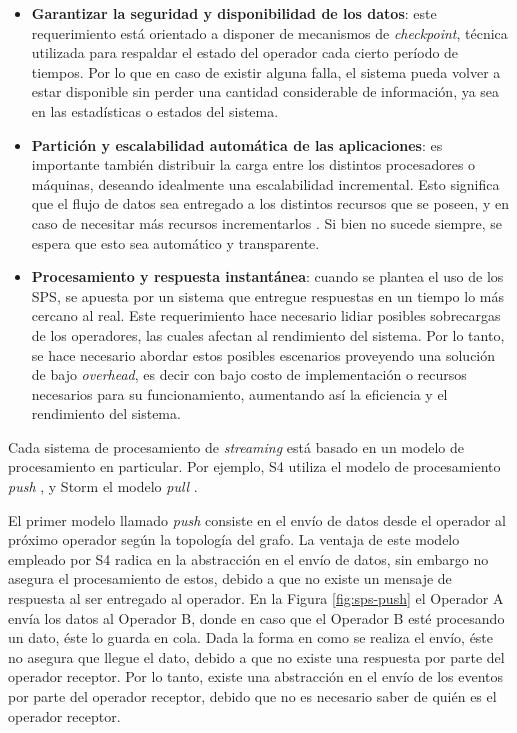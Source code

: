 \begin{itemize}
	\item \textbf{Garantizar la seguridad y disponibilidad de los datos}: este requerimiento est\'a orientado \normalsize{a disponer de} mecanismos de \textit{checkpoint}, t\'ecnica utilizada para respaldar el estado del operador cada cierto per\'iodo de tiempos. Por lo que en caso de existir alguna falla, el sistema pueda volver a estar disponible sin perder una cantidad considerable de informaci\'on, ya sea en las estad\'isticas o estados del sistema.
	\item \textbf{Partici\'on y escalabilidad autom\'atica de las aplicaciones}: es importante tambi\'en distribuir la carga entre los distintos procesadores o m\'aquinas, deseando idealmente una escalabilidad incremental. Esto significa que el flujo de datos sea entregado a los distintos recursos que se poseen, y en caso de necesitar m\'as recursos incrementarlos \citep{bookTanenbaum}. Si bien no sucede siempre, se espera que esto sea autom\'atico y transparente.
	\item \textbf{Procesamiento y respuesta instant\'anea}: cuando se plantea el uso de los SPS, se apuesta por un sistema que entregue respuestas en un tiempo lo m\'as cercano al real. Este requerimiento hace necesario lidiar posibles sobrecargas de los operadores, las cuales afectan al rendimiento del sistema. Por lo tanto, se hace necesario abordar estos posibles escenarios proveyendo una soluci\'on de bajo \textit{overhead}, \normalsize{es decir} con bajo costo de implementaci\'on o recursos necesarios para su funcionamiento, aumentando as\'i la eficiencia y el rendimiento del sistema.
\end{itemize}

Cada sistema de procesamiento de \textsl{streaming} est\'a basado en un modelo de procesamiento en particular. Por ejemplo, S4 utiliza el modelo de procesamiento \textsl{push} \citep{s4yahoo}, y Storm el modelo \textsl{pull} \citep{stormtwitter}.

El primer modelo llamado \textit{push} consiste en el env\'io de datos desde el operador \normalsize{al pr\'oximo operador seg\'un la topolog\'ia del grafo}. La ventaja de este modelo empleado por S4 radica en la abstracci\'on en el env\'io de datos, sin embargo no asegura el procesamiento de estos, debido a que no existe un mensaje de respuesta al ser entregado al operador. En la Figura \ref{fig:sps-push} el Operador A env\'ia los datos al Operador B, donde en caso que el Operador B est\'e procesando un dato, \'este lo guarda en cola. \normalsize{Dada la forma en como se realiza el env\'io, \'este no asegura que llegue el dato, debido a que no existe una respuesta por parte del operador receptor. Por lo tanto, existe una abstracci\'on en el env\'io de los eventos por parte del operador receptor, debido que no es necesario saber de qui\'en es el operador receptor.}

